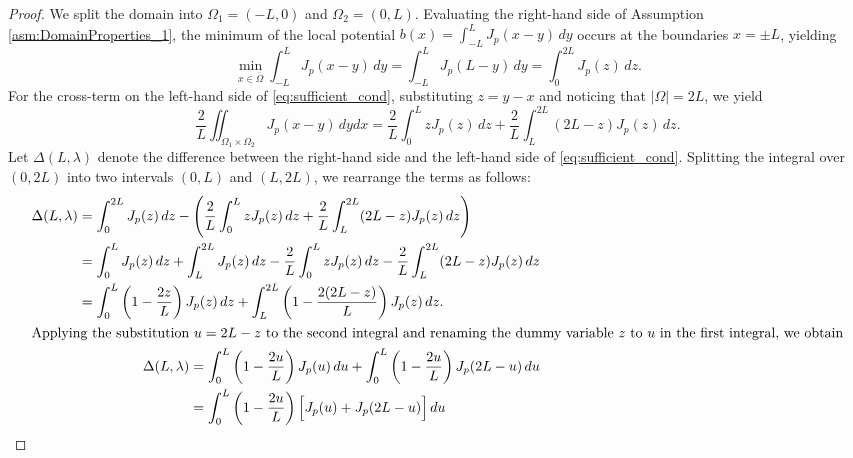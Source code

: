 \documentclass[12pt, a4paper]{article}
\theoremstyle{break}
\theoremstyle{break}
\theoremstyle{break}
\theoremstyle{break}
\theoremstyle{break}
\theoremstyle{break}
\theoremstyle{break}
\theoremstyle{break}
\theoremstyle{break}
\begin{document}
\begin{proof}
    We split the domain into $\Omega_1 = (-L, 0)$ and $\Omega_2 = (0, L)$. Evaluating the right-hand side of Assumption \ref{asm:DomainProperties_1}, the minimum of the local potential $b(x) = \int_{-L}^L J_p(x-y) \, dy$ occurs at the boundaries $x = \pm L$, yielding
    \begin{equation*}
        \min_{x \in \overline{\Omega}} \int_{-L}^L J_p(x-y) \, dy = \int_{-L}^L J_p(L-y) \, dy = \int_0^{2L} J_p(z) \, dz.
    \end{equation*}
    For the cross-term on the left-hand side of \eqref{eq:sufficient_cond}, substituting $z = y-x$ and noticing that $|\Omega| = 2L$, we yield
    \begin{equation*}
        \frac{2}{L} \iint_{\Omega_1 \times \Omega_2} J_p(x-y) \, dy dx = \frac{2}{L} \int_0^L z J_p(z) \, dz + \frac{2}{L} \int_L^{2L} (2L-z) J_p(z) \, dz.
    \end{equation*}
    Let $\Delta(L, \lambda)$ denote the difference between the right-hand side and the left-hand side of \eqref{eq:sufficient_cond}. Splitting the integral over $(0, 2L)$ into two intervals $(0, L)$ and $(L, 2L)$, we rearrange the terms as follows:
    \begin{align}
        \begin{split}
            \label{eq:Delta_1st_set}
            \Delta(L, \lambda) &= \int_0^{2L} J_p(z) \, dz - \left( \frac{2}{L} \int_0^L z J_p(z) \, dz + \frac{2}{L} \int_L^{2L} (2L-z) J_p(z) \, dz \right) \\
            &= \int_0^L J_p(z) \, dz + \int_L^{2L} J_p(z) \, dz - \frac{2}{L} \int_0^L z J_p(z) \, dz - \frac{2}{L} \int_L^{2L} (2L-z) J_p(z) \, dz \\
            &= \int_0^L \left( 1 - \frac{2z}{L} \right) J_p(z) \, dz + \int_L^{2L} \left( 1 - \frac{2(2L-z)}{L} \right) J_p(z) \, dz. 
        \end{split} \\
    \intertext{Applying the substitution $u = 2L - z$ to the second integral and renaming the dummy variable $z$ to $u$ in the first integral, we obtain}
        \begin{split}
            \label{eq:Delta_2nd_set}
            \Delta(L, \lambda) &= \int_0^L \left( 1 - \frac{2u}{L} \right) J_p(u) \, du + \int_0^L \left( 1 - \frac{2u}{L} \right) J_p(2L-u) \, du \\
            &= \int_0^L \left( 1 - \frac{2u}{L} \right) \Big[ J_p(u) + J_p(2L-u) \Big] \, du \\

\end{split}
\end{align}
\end{proof}
\end{document}
